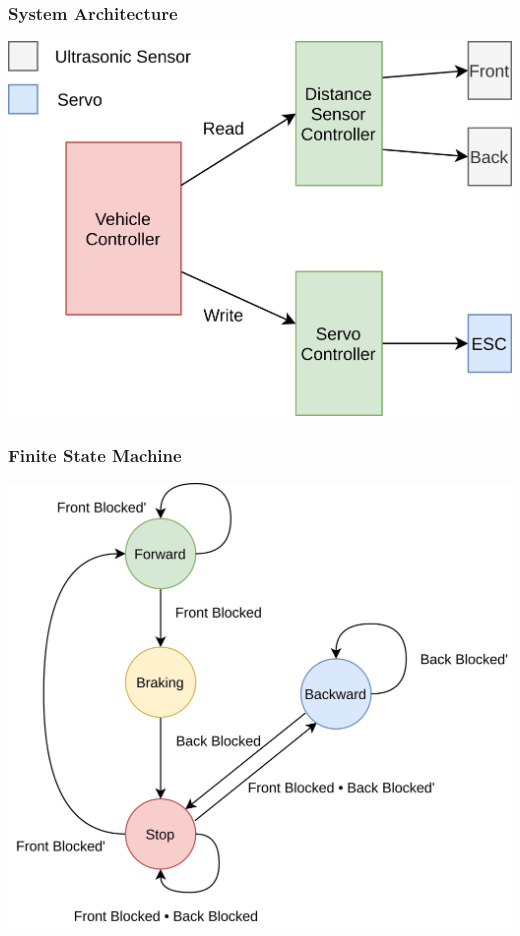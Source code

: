 \documentclass{beamer}
\begin{document}
    \begin{frame}
        \frametitle{System Architecture}
        \centering
        \includegraphics[scale=0.065]{img/system-architecture.png}
    \end{frame}

    \begin{frame}
        \frametitle{Finite State Machine}
        \centering
        \includegraphics[scale=0.06, keepaspectratio]{img/finite-state-machine.png}
    \end{frame}
\end{document}
